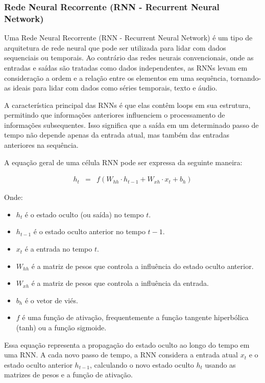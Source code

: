\subsubsection{Rede Neural Recorrente (RNN - Recurrent Neural Network)}


Uma Rede Neural Recorrente (RNN - Recurrent Neural Network) é um tipo de arquitetura de rede neural que pode ser utilizada para lidar com dados sequenciais ou temporais. Ao contrário das redes neurais convencionais, onde as entradas e saídas são tratadas como dados independentes, as RNNs levam em consideração a ordem e a relação entre os elementos em uma sequência, tornando-as ideais para lidar com dados como séries temporais, texto e áudio.

A característica principal das RNNs é que elas contêm loops em sua estrutura, permitindo que informações anteriores influenciem o processamento de informações subsequentes. Isso significa que a saída em um determinado passo de tempo não depende apenas da entrada atual, mas também das entradas anteriores na sequência.

A equação geral de uma célula RNN pode ser expressa da seguinte maneira:

\begin{eqnarray}
	h_t &=& f(W_{hh} \cdot h_{t-1} + W_{xh} \cdot x_t + b_h)
\end{eqnarray}

Onde:
\begin{itemize}
	\item \( h_t \) é o estado oculto (ou saída) no tempo \( t \).
	\item \( h_{t-1} \) é o estado oculto anterior no tempo \( t-1 \).
	\item \( x_t \) é a entrada no tempo \( t \).
	\item \( W_{hh} \) é a matriz de pesos que controla a influência do estado oculto anterior.
	\item \( W_{xh} \) é a matriz de pesos que controla a influência da entrada.
	\item \( b_h \) é o vetor de viés.
	\item \( f \) é uma função de ativação, frequentemente a função tangente hiperbólica (tanh) ou a função sigmoide.
\end{itemize}

Essa equação representa a propagação do estado oculto ao longo do tempo em uma RNN. A cada novo passo de tempo, a RNN considera a entrada atual \( x_t \) e o estado oculto anterior \( h_{t-1} \), calculando o novo estado oculto \( h_t \) usando as matrizes de pesos e a função de ativação.

